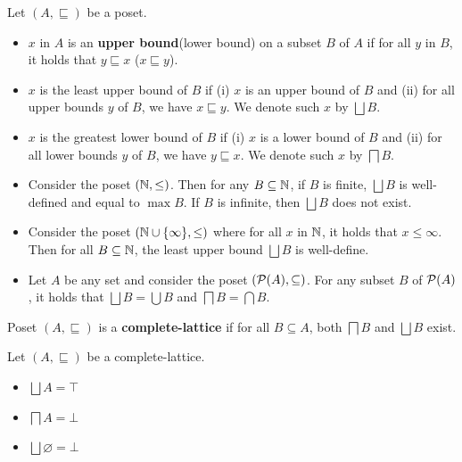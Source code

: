 {{\begin{definition}
\begin{itemize}
    \end{itemize}
\end{definition}
\begin{definition}
    Let $(A,\sqsubseteq)$ be a poset.
    \begin{itemize}
        \item $x$ in $A$ is an \textbf{upper bound}(lower bound) on a subset $B$ of $A$ if for all $y$ in $B$, it holds that $y \sqsubseteq x$ ($x \sqsubseteq y$).
        \item $x$ is the least upper bound of $B$ if (i) $x$ is an upper bound of $B$ and (ii) for all upper bounds $y$ of $B$, we have $x \sqsubseteq y$. We denote such $x$ by $\bigsqcup B$.
        \item $x$ is the greatest lower bound of $B$ if (i) $x$ is a lower bound of $B$ and (ii) for all lower bounds $y$ of $B$, we have $y \sqsubseteq x$. We denote such $x$ by $\bigsqcap B$.
    \end{itemize}
\end{definition}
\begin{example} 
    \begin{itemize}
        \item Consider the poset $(\N,\leq)$. Then for any $B \subseteq \N$, if $B$ is finite, $\bigsqcup B$ is well-defined and equal to $\max B$. If $B$ is infinite, then $\bigsqcup B$ does not exist. 
        \item Consider the poset $(\N \cup \{\infty\},\leq)$ where for all $x$ in $\N$, it holds that $x \leq \infty$. Then for all $B \subseteq \N$, the least upper bound $\bigsqcup B$ is well-define. 
        \item Let $A$ be any set and consider the poset $(\P(A),\subseteq)$. For any subset $B$ of $\P(A)$, it holds that $\bigsqcup B = \bigcup B$ and $\bigsqcap B = \bigcap B$. 
    \end{itemize}
\end{example}
\begin{definition}
    Poset $(A,\sqsubseteq)$ is a \textbf{complete-lattice} if for all $B \subseteq A$, both $\bigsqcap B$ and $\bigsqcup B$ exist.
\end{definition}
\begin{example}
    Let $(A,\sqsubseteq)$ be a complete-lattice. 
    \begin{itemize}
        \item $\bigsqcup A = \top$
        \item $\bigsqcap A = \bot$
        \item $\bigsqcup \varnothing = \bot$

\end{itemize}
\end{example}}}
